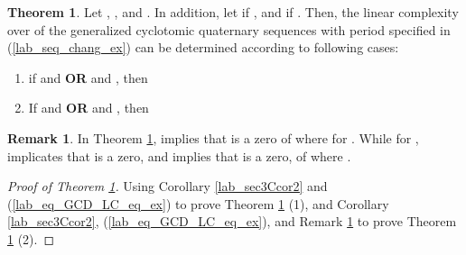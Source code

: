 \documentclass{mcom-l}
\theoremstyle{definition}
\newtheorem{sec3Cremark2}[sec3_remark1]{Remark}
\newtheorem{sec3CThm02}[sec3thm1]{Theorem}
\numberwithin{equation}{section}
\begin{document}
       \begin{sec3CThm02}\label{lab_sec3CThm02}
         Let , ,  and . In addition, let   if , and  if .
         Then, the linear complexity over  of the generalized cyclotomic quaternary sequences with period  specified in (\ref{lab_seq_chang_ex}) can be determined according to following cases: 
      \begin{enumerate} \item if  and   \textbf{OR}  and  , then 
      
      
        \item If  and   \textbf{OR}  and  , then 
    
      
    \end{enumerate}
     \end{sec3CThm02}
     \begin{sec3Cremark2}\label{Lab_sec3Cremark2}
     In Theorem \ref{lab_sec3CThm02},   implies that  is a zero of  where  for . While for ,  implicates that  is a zero, and  implies that  is a zero, of  where  .
     \end{sec3Cremark2}
     \begin{proof}[Proof of Theorem \ref{lab_sec3CThm02}]
         Using Corollary \ref{lab_sec3Ccor2} and (\ref{lab_eq_GCD_LC_eq_ex}) to prove Theorem \ref{lab_sec3CThm02} (1), and  Corollary \ref{lab_sec3Ccor2}, (\ref{lab_eq_GCD_LC_eq_ex}), and Remark \ref{Lab_sec3Cremark2} to prove Theorem \ref{lab_sec3CThm02} (2).
         \end{proof}
     
\end{document}
